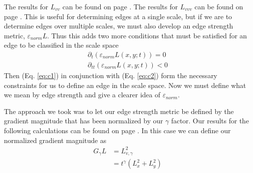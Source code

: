 \documentclass{article}
\begin{document}
The results for $L_{vv}$ can be found on page \pageref{t_vv}.
The results for $L_{vvv}$ can be found on page \pageref{t_vvv}.
This is useful for determining edges at a single scale, but if we are to determine edges over multiple scales, we must also develop an edge strength metric, $\varepsilon_{norm}L$.
Thus this adds two more conditions that must be satisfied for an edge to be classified in the scale space \cite{Lindeberg1998}
\begin{equation} \label{eq:c2}
  \begin{aligned}
    \partial_t(\varepsilon_{norm}L(x,y;t)) = 0\\
    \partial_{tt}(\varepsilon_{norm}L(x,y;t)) < 0
  \end{aligned}
\end{equation}
Then (Eq. \ref{eq:c1}) in conjunction with (Eq. \ref{eq:c2}) form the necessary constraints for us to define an edge in the scale space.
Now we must define what we mean by edge strength and give a clearer idea of $\varepsilon_{norm}$.

The approach we took was to let our edge strength metric be defined by the gradient magnitude that has been normalized by our $\gamma$ factor. 
Our results for the following calculations can be found on page \pageref{t_gma}.
In this case we can define our normalized gradient magnitude as \cite{Lindeberg1998}
\begin{align}
  G_{\gamma}L &= L_{v,\gamma}^2 \\
  &= t^{\gamma}(L_x^2+L_y^2)
\end{align}
\end{document}
